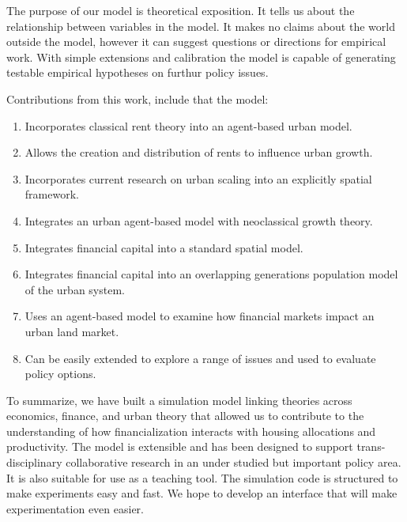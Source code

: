 The purpose of our model is \gls{theoretical exposition}. It tells us about the relationship between variables in the model.  It makes no claims about the world outside the model, however it can suggest questions or directions for empirical work. With simple extensions and calibration the model is capable of generating testable empirical hypotheses on furthur policy issues.  %

Contributions from this work, include that the model: 
\begin{enumerate}
    \item  Incorporates \gls{classical rent theory} into an \gls{agent-based} urban model. 
    
    \item Allows the creation and distribution of rents to influence urban growth. 
    
    \item Incorporates current research on \gls{urban scaling} into an explicitly spatial framework.
    
    \item Integrates an urban \gls{agent-based model} with {neoclassical growth theory}. 
    
    \item Integrates \gls{financial capital} into a standard spatial model.
    
    \item Integrates financial capital into an \gls{overlapping generations} population model of the urban system.
    
    \item Uses an agent-based model to examine how financial markets impact an urban \gls{land market}. 

    \item Can be easily extended to explore a range of issues and used to evaluate policy options. 
\end{enumerate}
To summarize, we have built a simulation model linking theories across economics, finance, and urban theory that allowed us to contribute to the understanding of how financialization interacts with housing allocations and productivity. The model is extensible and has been designed to support trans-disciplinary collaborative research in an under studied but important policy area. It is also suitable for use as a teaching tool. The simulation code is structured to make experiments easy and fast. We hope to develop an interface that will make experimentation even easier.

